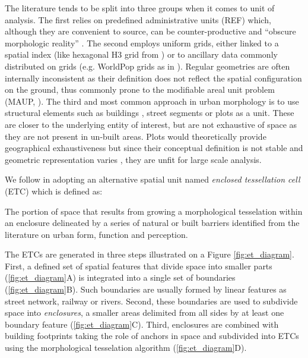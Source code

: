 The literature tends to be split into three groups when it comes to unit of
analysis.
%
The first relies on predefined administrative units (REF)
which, although they are convenient to source, can be counter-productive and
“obscure morphologic reality” \citep{taubenbock2019new}.
%
The second employs uniform grids, either linked to a spatial index (like hexagonal H3 grid
from \citealp{brodsky2018h3}) or to ancillary data commonly distributed on
grids (e.g. WorldPop grids as in \citealp{jochem2020}). Regular geometries are often internally
inconsistent as their definition does not reflect the spatial configuration on the
ground, thus commonly prone to the modifiable areal unit problem (MAUP,
\citealp{openshaw1981modifiable}).
%
The third and most common approach in urban morphology is to use structural
elements such as
buildings \citep{hamaina2012a}, street segments \citep{araldi2019} or plots
\citep{berghauserpont2019a} as a unit. These are closer to the underlying
entity of interest, but are not exhaustive of space as they are not
present in un-built areas. Plots would theoretically provide geographical exhaustiveness
but since their conceptual definition is not stable and geometric representation varies
\citep{kropf2018plots}, they are unfit for large scale analysis.

We follow \cite{dab_mf_2021} in adopting an alternative spatial unit named \textit{enclosed tessellation cell}
(ETC) which is defined as:

\begin{theorem}
    The portion of space that results from growing a morphological tesselation within an
enclosure delineated by a series of natural or built barriers identified from the
literature on urban form, function and perception.
\end{theorem}

The ETCs are generated in three steps illustrated on a Figure \ref{fig:et_diagram}.
First, a defined set of spatial features that divide space into smaller parts
(\ref{fig:et_diagram}A) is integrated into a single set of boundaries
(\ref{fig:et_diagram}B). Such boundaries are usually formed by linear features as street
network, railway or rivers. Second, these boundaries are used to subdivide space into
\textit{enclosures}, a smaller areas delimited from all sides by at least one boundary
feature (\ref{fig:et_diagram}C). Third, enclosures are combined with building footprints
taking the role of anchors in space and subdivided into ETCs using the morphological tesselation algorithm
\citep{fleischmann2020morphological} (\ref{fig:et_diagram}D).


